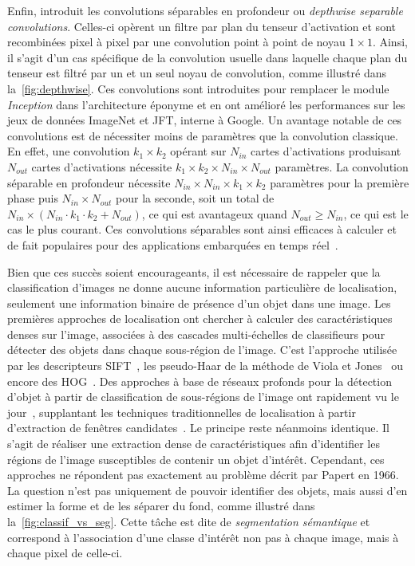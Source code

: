 Enfin, \citet{chollet_xception_2017} introduit les convolutions séparables en profondeur ou \emph{depthwise separable convolutions}. Celles-ci opèrent un filtre par plan du tenseur d'activation et sont recombinées pixel à pixel par une convolution point à point de noyau $1\times1$. Ainsi, il s'agit d'un cas spécifique de la convolution usuelle dans laquelle chaque plan du tenseur est filtré par un et un seul noyau de convolution, comme illustré dans la~\cref{fig:depthwise}. Ces convolutions sont introduites pour remplacer le module \emph{Inception} dans l'architecture éponyme et en ont amélioré les performances sur les jeux de données ImageNet et JFT, interne à Google. Un avantage notable de ces convolutions est de nécessiter moins de paramètres que la convolution classique. En effet, une convolution $k_1 \times k_2$ opérant sur $N_{in}$ cartes d'activations produisant $N_{out}$ cartes d'activations nécessite $k_1 \times k_2 \times N_{in} \times N_{out}$ paramètres. La convolution séparable en profondeur nécessite $N_{in} \times N_{in} \times k_1 \times k_2$ paramètres pour la première phase puis $N_{in} \times N_{out}$ pour la seconde, soit un total de $N_{in} \times (N_{in} \cdot k_1 \cdot k_2 + N_{out})$, ce qui est avantageux quand $N_{out} \ge N_{in}$, ce qui est le cas le plus courant. Ces convolutions séparables sont ainsi efficaces à calculer et de fait populaires pour des applications embarquées en temps réel~\cite{howard_mobilenets_2017}.

Bien que ces succès soient encourageants, il est nécessaire de rappeler que la classification d'images ne donne aucune information particulière de localisation, seulement une information binaire de présence d'un objet dans une image. Les premières approches de localisation ont chercher à calculer des caractéristiques denses sur l'image, associées à des cascades multi-échelles de classifieurs pour détecter des objets dans chaque sous-région de l'image. C'est l'approche utilisée par les descripteurs \gls{SIFT}~\cite{lowe_object_1999}, les pseudo-Haar de la méthode de Viola et Jones~\cite{viola_robust_2001} ou encore des \gls{HOG}~\cite{dalal_histograms_2005}. Des approches à base de réseaux profonds pour la détection d'objet à partir de classification de sous-régions de l'image ont rapidement vu le jour~\cite{girshick_rich_2014,liu_ssd_2016,girshick_region-based_2016}, supplantant les techniques traditionnelles de localisation à partir d'extraction de fenêtres candidates~\cite{gu_recognition_2009,uijlings_selective_2013}. Le principe reste néanmoins identique. Il s'agit de réaliser une extraction dense de caractéristiques afin d'identifier les régions de l'image susceptibles de contenir un objet d'intérêt. Cependant, ces approches ne répondent pas exactement au problème décrit par Papert en 1966. La question n'est pas uniquement de pouvoir identifier des objets, mais aussi d'en estimer la forme et de les séparer du fond, comme illustré dans la~\cref{fig:classif_vs_seg}. Cette tâche est dite de \emph{segmentation sémantique} et correspond à l'association d'une classe d'intérêt non pas à chaque image, mais à chaque pixel de celle-ci.

